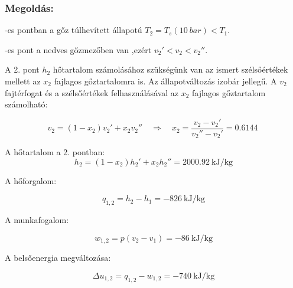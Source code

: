 \noindent\hrulefill

\vspace{2mm}
\subsubsection{Megoldás:}



-es pontban a gőz túlhevített állapotú $T_2 = T_s(\SI{10}{bar}) < T_1$.
\vspace{2mm}

-es pont a nedves gőzmezőben van ,ezért $v_2'<v_2<v_2''$.
\vspace{2mm}

\noindent
A 2. pont $h_2$ hőtartalom számolásához szükségünk van az ismert szélsőértékek mellett az $x_2$ fajlagos gőztartalomra is. Az állapotváltozás izobár jellegű. A $v_2$ fajtérfogat és a szélsőértékek felhasználásával az $x_2$ fajlagos gőztartalom számolható:

\begin{equation*}
	v_2 = \left(1 - x_2\right) v_2' + x_2 v_2''
	\quad 
	\Rightarrow
	\quad 
	x_2 = \dfrac{v_2 - v_2'}{v_2'' - v_2'} = \SI{0,6144}{}
\end{equation*}

\noindent A hőtartalom a 2. pontban:
\begin{equation*}
	h_2 = \left(1 - x_2\right) h_2' + x_2 h_2'' = \SI{2000,92}{\kilo\joule\per\kilogram}
\end{equation*}

\pagebreak

\noindent A hőforgalom:

\begin{equation*}
	q_{1,2} = h_2 - h_1 = \SI{-826}{\kilo\joule\per\kilogram}
\end{equation*}

\noindent A munkafogalom:

\begin{equation*}
	w_{1,2} = p(v_2 - v_1) = \SI{-86}{\kilo\joule\per\kilogram}
\end{equation*}

\noindent A belsőenergia megváltozása:

\begin{equation*}
	\Delta u_{1,2} = q_{1,2} - w_{1,2} = \SI{-740}{\kilo\joule\per\kilogram}
\end{equation*}



